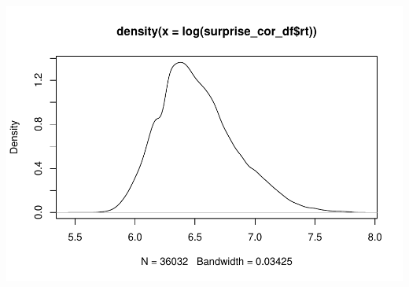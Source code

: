 \documentclass[
]{article}
\begin{document}
\includegraphics{20_variational_inference_files/figure-latex/unnamed-chunk-17-1.pdf}
\end{document}
